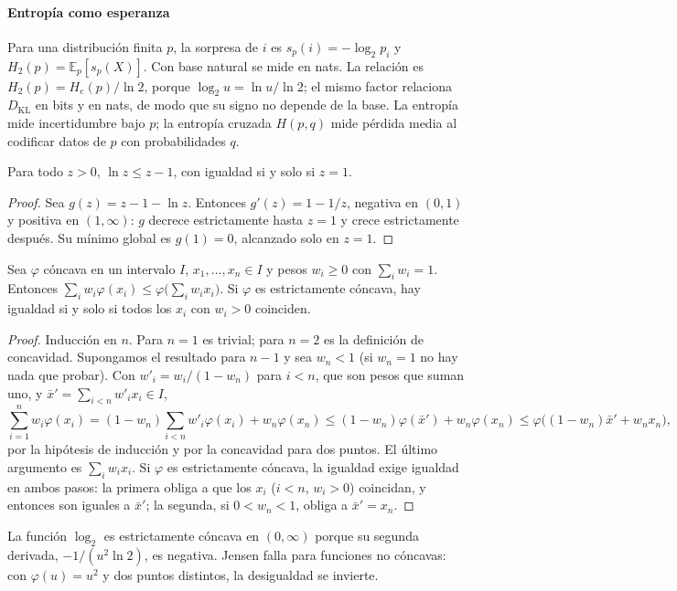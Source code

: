 \paragraph{Entropía como esperanza}
Para una distribución finita $p$, la sorpresa de $i$ es
$s_p(i)=-\log_2p_i$ y $H_2(p)=\mathbb E_p[s_p(X)]$.
Con base natural se mide en nats. La relación es
$H_2(p)=H_e(p)/\ln2$, porque $\log_2u=\ln u/\ln2$; el mismo factor relaciona
$D_{\mathrm{KL}}$ en bits y en nats, de modo que su signo no depende de la base.
La entropía mide incertidumbre bajo $p$;
la entropía cruzada $H(p,q)$ mide pérdida media al codificar datos de $p$
con probabilidades $q$.

\begin{lema}\label{s01:lem:lnz}
Para todo $z>0$, $\ln z\le z-1$, con igualdad si y solo si $z=1$.
\end{lema}
\begin{proof}
Sea $g(z)=z-1-\ln z$. Entonces $g'(z)=1-1/z$, negativa en $(0,1)$ y positiva en
$(1,\infty)$: $g$ decrece estrictamente hasta $z=1$ y crece estrictamente después.
Su mínimo global es $g(1)=0$, alcanzado solo en $z=1$.
\end{proof}

\begin{lema}\label{s01:lem:jensen}
Sea $\varphi$ cóncava en un intervalo $I$, $x_1,\ldots,x_n\in I$ y pesos
$w_i\ge0$ con $\sum_iw_i=1$. Entonces
$\sum_iw_i\varphi(x_i)\le\varphi\bigl(\sum_iw_ix_i\bigr)$. Si $\varphi$ es
estrictamente cóncava, hay igualdad si y solo si todos los $x_i$ con $w_i>0$
coinciden.
\end{lema}
\begin{proof}
Inducción en $n$. Para $n=1$ es trivial; para $n=2$ es la definición de
concavidad. Supongamos el resultado para $n-1$ y sea $w_n<1$ (si $w_n=1$ no hay
nada que probar). Con $w'_i=w_i/(1-w_n)$ para $i<n$, que son pesos que suman uno, y
$\bar x'=\sum_{i<n}w'_ix_i\in I$,
\[
\sum_{i=1}^nw_i\varphi(x_i)=(1-w_n)\sum_{i<n}w'_i\varphi(x_i)+w_n\varphi(x_n)
\le(1-w_n)\varphi(\bar x')+w_n\varphi(x_n)
\le\varphi\bigl((1-w_n)\bar x'+w_nx_n\bigr),
\]
por la hipótesis de inducción y por la concavidad para dos puntos. El último
argumento es $\sum_iw_ix_i$. Si $\varphi$ es estrictamente cóncava, la igualdad
exige igualdad en ambos pasos: la primera obliga a que los $x_i$ ($i<n$, $w_i>0$)
coincidan, y entonces son iguales a $\bar x'$; la segunda, si $0<w_n<1$, obliga
a $\bar x'=x_n$.
\end{proof}
\noindent La función $\log_2$ es estrictamente cóncava en $(0,\infty)$ porque su
segunda derivada, $-1/(u^2\ln2)$, es negativa. Jensen falla para funciones no
cóncavas: con $\varphi(u)=u^2$ y dos puntos distintos, la desigualdad se invierte.

